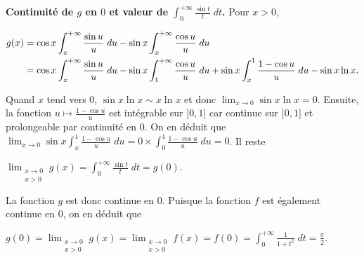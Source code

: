 {{\textbf{Continuité de $g$ en $0$ et valeur de $\int_{0}^{+\infty}\frac{\sin t}{t}\;dt$.} Pour $x>0$,

\begin{align*}\ensuremath
g(x)&=\cos x\int_{x}^{+\infty}\frac{\sin u}{u}\;du-\sin x\int_{x}^{+\infty}\frac{\cos u}{u}\;du\\
 &=\cos x\int_{x}^{+\infty}\frac{\sin u}{u}\;du-\sin x\int_{1}^{+\infty}\frac{\cos u}{u}\;du+\sin x\int_{x}^{1}\frac{1-\cos u}{u}\;du-\sin x\ln x.
\end{align*}

Quand $x$ tend vers $0$, $\sin x\ln x\sim x\ln x$ et donc $\lim_{x \rightarrow 0}\sin x\ln x=0$. Ensuite, la fonction $u\mapsto\frac{1-\cos u}{u}$ est intégrable sur $]0,1]$ car continue sur $]0,1]$ et prolongeable par continuité en $0$. On en déduit que $\lim_{x \rightarrow 0}\sin x\int_{x}^{1}\frac{1-\cos u}{u}\;du=0\times\int_{0}^{1}\frac{1-\cos u}{u}\;du=0$. Il reste

\begin{center}
$\displaystyle\lim_{\substack{x\rightarrow0\\ x>0}}g(x)=\int_{0}^{+\infty}\frac{\sin t}{t}\;dt=g(0)$.
\end{center}

La fonction $g$ est donc continue en $0$. Puisque la fonction $f$ est également continue en $0$, on en déduit que

\begin{center}
$g(0)=\displaystyle\lim_{\substack{x\rightarrow0\\ x>0}}g(x)=\displaystyle\lim_{\substack{x\rightarrow0\\ x>0}}f(x)=f(0)=\int_{0}^{+\infty}\frac{1}{1+t^2}\;dt=\frac{\pi}{2}$.
\end{center}

\begin{center}
\end{center}}
}